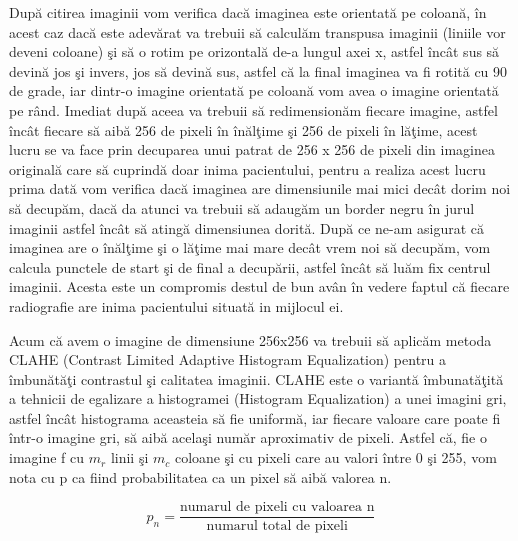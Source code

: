Dup\u{a} citirea imaginii vom verifica dac\u{a} imaginea este orientat\u{a} pe coloan\u{a}, \^{i}n acest caz dac\u{a} este adev\u{a}rat  va trebuii s\u{a} calcul\u{a}m transpusa imaginii (liniile vor deveni coloane) \c{s}i s\u{a} o rotim pe orizontal\u{a} de-a lungul axei x, astfel \^{i}nc\^{a}t sus s\u{a} devin\u{a} jos \c{s}i invers, jos s\u{a} devin\u{a} sus, astfel c\u{a} la final imaginea va fi rotit\u{a} cu 90 de grade, iar dintr-o imagine orientat\u{a} pe coloan\u{a} vom avea o imagine orientat\u{a} pe r\^{a}nd. Imediat dup\u{a} aceea va trebuii s\u{a} redimension\u{a}m fiecare imagine, astfel \^{i}nc\^{a}t fiecare s\u{a} aib\u{a} 256 de pixeli \^{i}n \^{i}n\u{a}l\c{t}ime \c{s}i 256 de pixeli \^{i}n l\u{a}\c{t}ime, acest lucru se va face prin decuparea unui patrat de 256 x 256 de pixeli din imaginea original\u{a} care s\u{a} cuprind\u{a} doar inima pacientului, pentru a realiza acest lucru prima dat\u{a} vom verifica dac\u{a} imaginea are dimensiunile mai mici dec\^{a}t dorim noi s\u{a} decup\u{a}m, dac\u{a} da atunci va trebuii s\u{a} adaug\u{a}m un border negru \^{i}n jurul imaginii astfel \^{i}nc\^{a}t s\u{a} ating\u{a} dimensiunea dorit\u{a}. Dup\u{a} ce ne-am asigurat c\u{a} imaginea are o \^{i}n\u{a}l\c{t}ime \c{s}i o l\u{a}\c{t}ime mai mare dec\^{a}t vrem noi s\u{a} decup\u{a}m,  vom calcula punctele de start \c{s}i de final a decup\u{a}rii, astfel \^{i}nc\^{a}t s\u{a} lu\u{a}m fix centrul imaginii. Acesta este un compromis destul de bun av\^{a}n \^{i}n vedere faptul c\u{a} fiecare radiografie are inima pacientului situat\u{a} in mijlocul ei.

\par

Acum c\u{a} avem o imagine de dimensiune 256x256 va trebuii s\u{a} aplic\u{a}m metoda CLAHE (Contrast Limited Adaptive Histogram Equalization) pentru a \^{i}mbun\u{a}t\u{a}\c{t}i contrastul \c{s}i calitatea imaginii. CLAHE este o variant\u{a} \^{i}mbunat\u{a}\c{t}it\u{a} a tehnicii de egalizare a histogramei (Histogram Equalization) a unei imagini gri, astfel \^{i}nc\^{a}t histograma aceasteia s\u{a} fie uniform\u{a}, iar fiecare valoare care poate fi \^{i}ntr-o imagine gri, s\u{a} aib\u{a} acela\c{s}i num\u{a}r aproximativ de pixeli. Astfel c\u{a}, fie o imagine f cu $m_r$ linii \c{s}i $m_c$ coloane \c{s}i cu pixeli care au valori \^{i}ntre 0 \c{s}i 255, vom nota cu p ca fiind probabilitatea ca un pixel s\u{a} aib\u{a} valorea n.

$$p_n = \frac{\text{numarul de pixeli cu valoarea n}}{\text{numarul total de pixeli}}$$

